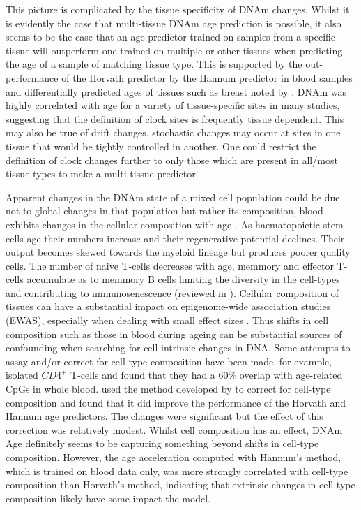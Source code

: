 \documentclass[
]{book}
\begin{document}
This picture is complicated by the tissue specificity of DNAm changes. Whilst it is evidently the case that multi-tissue DNAm age prediction is possible, it also seems to be the case that an age predictor trained on samples from a specific tissue will outperform one trained on multiple or other tissues when predicting the age of a sample of matching tissue type. This is supported by the out-performance of the Horvath predictor by the Hannum predictor in blood samples \citep{Marioni2015} and differentially predicted ages of tissues such as breast noted by \citet{Horvath2013}. DNAm was highly correlated with age for a variety of tissue-specific sites in many studies, suggesting that the definition of clock sites is frequently tissue dependent. This may also be true of drift changes, stochastic changes may occur at sites in one tissue that would be tightly controlled in another. One could restrict the definition of clock changes further to only those which are present in all/most tissue types to make a multi-tissue predictor.

Apparent changes in the DNAm state of a mixed cell population could be due not to global changes in that population but rather its composition, blood exhibits changes in the cellular composition with age \citep{Rimmele2014}. As haematopoietic stem cells age their numbers increase and their regenerative potential declines. Their output becomes skewed towards the myeloid lineage but produces poorer quality cells. The number of naive T-cells decreases with age, memmory and effector T-cells accumulate as to memmory B cells limiting the diversity in the cell-types and contributing to immunosenescence (reviewed in \citep{Geiger2013}). Cellular composition of tissues can have a substantial impact on epigenome-wide association studies (EWAS), especially when dealing with small effect sizes \citep{Jaffe2014}. Thus shifts in cell composition such as those in blood during ageing can be substantial sources of confounding when searching for cell-intrinsic changes in DNA. Some attempts to assay and/or correct for cell type composition have been made, for example, \citet{Rakyan2010} isolated \(CD4^+\) T-cells and found that they had a 60\% overlap with age-related CpGs in whole blood. \citet{Chen2016a} used the method developed by \citet{Houseman2012} to correct for cell-type composition and found that it did improve the performance of the Horvath and Hannum age predictors. The changes were significant but the effect of this correction was relatively modest. Whilst cell composition has an effect, DNAm Age definitely seems to be capturing something beyond shifts in cell-type composition. However, the age acceleration computed with Hannum's method, which is trained on blood data only, was more strongly correlated with cell-type composition than Horvath's method, indicating that extrinsic changes in cell-type composition likely have some impact the model.
\end{document}
